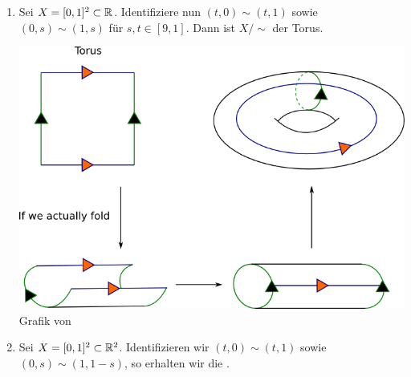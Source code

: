 \begin{example}
    \begin{enumerate}[1)]
        \item Sei $X = [0,1]^2 \subset \mathbb{R}$. Identifiziere nun $(t,0) \sim  (t,1)$ sowie $(0,s) \sim  (1,s)$ für $s,t\in [9,1]$. Dann ist $X / \sim $ der Torus.


        \begin{minipage}{\textwidth}
            \centering
            \includegraphics[width=\textwidth]{figures/part1.png}
            \scriptsize Grafik von \cite{img:torus-folding}
        \end{minipage}


        \item Sei $X = [0,1] ^2 \subset \mathbb{R}^2$. Identifizieren wir $(t,0) \sim  (t,1)$ sowie $(0,s) \sim  (1, 1-s)$, so erhalten wir die . 



\end{enumerate}
\end{example}
